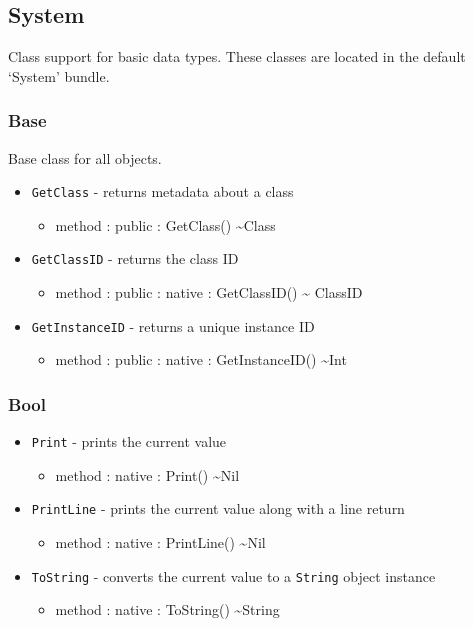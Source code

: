 \documentclass[11pt]{article}
\begin{document}
\subsection{System}
Class support for basic data types. These classes are located in the
default `System' bundle.

\subsubsection{Base}
Base class for all objects.
\begin{itemize}
\item \texttt{GetClass} - returns metadata about a class
  \begin{itemize}
  \item method : public : GetClass() \textasciitilde Class
  \end{itemize}
\item \texttt{GetClassID} - returns the class ID
  \begin{itemize}
  \item method : public : native : GetClassID() \textasciitilde
    ClassID
  \end{itemize}
\item \texttt{GetInstanceID} - returns a unique instance ID
  \begin{itemize}
  \item method : public : native : GetInstanceID() \textasciitilde Int
  \end{itemize}
\end{itemize}

\subsubsection{Bool}
\begin{itemize}
\item \texttt{Print} - prints the current value
  \begin{itemize}
  \item method : native : Print() \textasciitilde Nil
  \end{itemize}
\item \texttt{PrintLine} - prints the current value along with a line
  return
  \begin{itemize}
  \item method : native : PrintLine() \textasciitilde Nil
  \end{itemize}
\item \texttt{ToString} - converts the current value to a
  \texttt{String} object instance
  \begin{itemize}
  \item method : native : ToString() \textasciitilde String
  \end{itemize}
\end{itemize}
\end{document}
